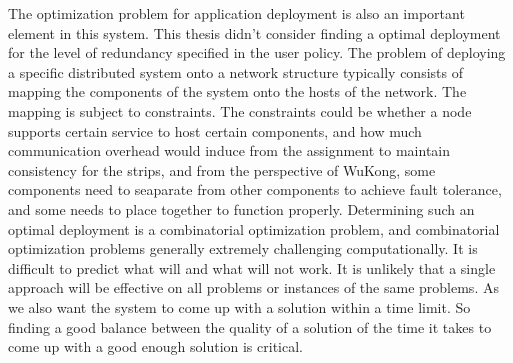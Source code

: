 The optimization problem for application deployment is also an important element
in this system. This thesis didn't consider finding a optimal deployment for the
level of redundancy specified in the user policy. The problem of deploying
a specific distributed system onto a network structure typically consists of
mapping the components of the system onto the hosts of the network. The mapping
is subject to constraints. The constraints could be whether a node supports
certain service to host certain components, and how much communication overhead
would induce from the assignment to maintain consistency for the strips, and
from the perspective of WuKong, some components need to seaparate from other
components to achieve fault tolerance, and some needs to place together to
function properly.  Determining such an optimal deployment is a combinatorial
optimization problem, and combinatorial optimization problems generally
extremely challenging computationally. It is difficult to predict what will and
what will not work.  It is unlikely that a single approach will be effective on
all problems or instances of the same problems. As we also want the system to
come up with a solution within a time limit. So finding a good balance between
the quality of a solution of the time it takes to come up with a good enough
solution is critical.
